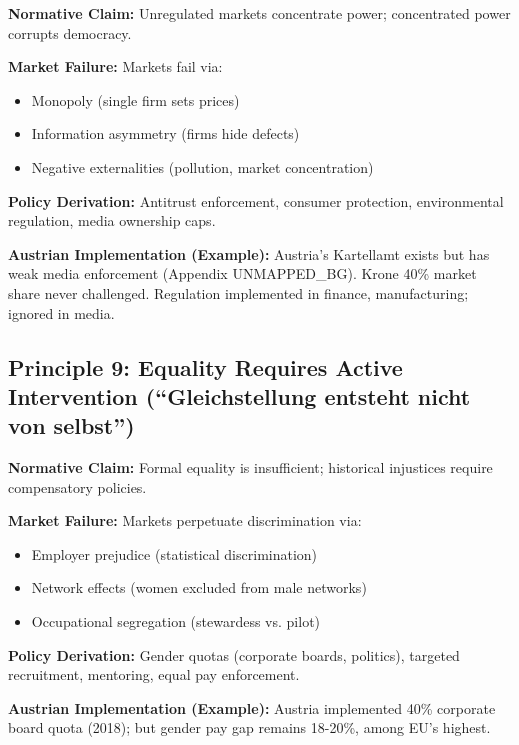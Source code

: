 \begin{tcolorbox}[colback=gray!5!white, colframe=gray!75!black,
    title=Principle GEN-8: Regulatory Framework]

\textbf{Normative Claim:} Unregulated markets concentrate power; concentrated power corrupts democracy.

\textbf{Market Failure:} Markets fail via:
\begin{itemize}[nosep]
\item Monopoly (single firm sets prices)
\item Information asymmetry (firms hide defects)
\item Negative externalities (pollution, market concentration)
\end{itemize}

\textbf{Policy Derivation:} Antitrust enforcement, consumer protection, environmental regulation, media ownership caps.

\textbf{Austrian Implementation (Example):} Austria's Kartellamt exists but has weak media enforcement (Appendix UNMAPPED_BG). Krone 40\% market share never challenged. Regulation implemented in finance, manufacturing; ignored in media.

\end{tcolorbox}


\subsection{Principle 9: Equality Requires Active Intervention (``Gleichstellung entsteht nicht von selbst'')}

\begin{tcolorbox}[colback=gray!5!white, colframe=gray!75!black,
    title=Principle GEN-9: Active Equity Programs]

\textbf{Normative Claim:} Formal equality is insufficient; historical injustices require compensatory policies.

\textbf{Market Failure:} Markets perpetuate discrimination via:
\begin{itemize}[nosep]
\item Employer prejudice (statistical discrimination)
\item Network effects (women excluded from male networks)
\item Occupational segregation (stewardess vs. pilot)
\end{itemize}

\textbf{Policy Derivation:} Gender quotas (corporate boards, politics), targeted recruitment, mentoring, equal pay enforcement.

\textbf{Austrian Implementation (Example):} Austria implemented 40\% corporate board quota (2018); but gender pay gap remains 18-20\%, among EU's highest.

\end{tcolorbox}

